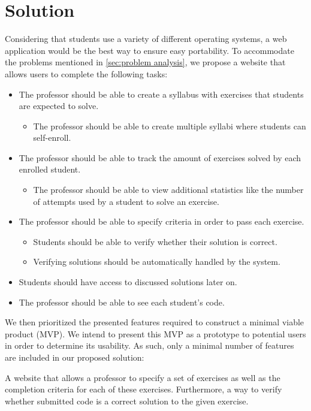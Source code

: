 \section{Solution}
Considering that students use a variety of different operating systems, a web application would be the best way to ensure easy portability.
To accommodate the problems mentioned in \ref{sec:problem analysis}, we propose a website that allows users to complete the following tasks:
\begin{itemize}
	\item The professor should be able to create a syllabus with exercises that students are expected to solve.
	\begin{itemize}
		\item The professor should be able to create multiple syllabi where students can self-enroll.
	\end{itemize}
	\item The professor should be able to track the amount of exercises solved by each enrolled student.
	\begin{itemize}
		\item The professor should be able to view additional statistics like the number of attempts used by a student to solve an exercise.
	\end{itemize}
	\item The professor should be able to specify criteria in order to pass each exercise.
	\begin{itemize}
		\item Students should be able to verify whether their solution is correct.
		\item Verifying solutions should be automatically handled by the system.
	\end{itemize}
	\item Students should have access to discussed solutions later on.
	\item The professor should be able to see each student's code.
\end{itemize}

We then prioritized the presented features required to construct a minimal viable product (MVP).
We intend to present this MVP as a prototype to potential users in order to determine its usability.
As such, only a minimal number of features are included in our proposed solution:

\begin{displayquote}
A website that allows a professor to specify a set of exercises as well as the completion criteria for each of these exercises. Furthermore, a way to verify whether submitted code is a correct solution to the given exercise.
\end{displayquote}